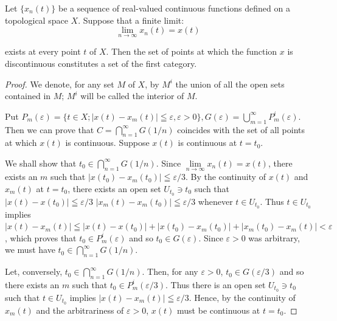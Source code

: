\begin{theoremn} Let $\{x_{n}(t)\}$ be a sequence of real-valued continuous functions defined on a topological space $X$. Suppose that a finite limit: 
\[
\lim\limits _{n \rightarrow \infty} x _{n} (t) = x (t)
\]

exists at every point $t$ of $X$. Then the set of points at which the function $x$ is discontinuous constitutes a set of the first category. 
\end{theoremn}

\begin{proof}
 We denote, for any set $M$ of $X$, by $M^{i}$ the union of all the open sets contained in $M$; $M^{i}$ will be called the interior of $M$. 

 Put $P_{m} (\varepsilon) = \{t \in X; | x (t)- x _{m} (t) | \leqq \varepsilon , \varepsilon > 0 \}, G (\varepsilon) = \bigcup\limits_{m=1} ^{\infty} P _{m} ^{i} (\varepsilon). $ Then we can prove that $C = \bigcap\limits_{n=1}^{\infty} G(1/n)$ coincides with the set of all points at which $x(t)$ is continuous. Suppose $x(t)$ is continuous at $t = t_0$. 

We shall show that $t_0 \in \bigcap\limits_{n=1}^{\infty} G(1/n)$. Since $\lim\limits_{n \to \infty} x_n(t) = x(t)$, there exists an $m$ such that $|x(t_0)- x_m(t_0)| \leqq \varepsilon/3$. By the continuity of $x(t)$ and $x_m(t)$ at $t = t_0$, there exists an open set $U_{t_0} \ni t_0$ such that $|x(t)- x(t_0)| \leqq \varepsilon/3$ $|x_m(t)- x_m(t_0)| \leqq \varepsilon/3$ whenever $t \in U_{t_0}$. Thus $t \in U_{t_0}$ implies $|x(t)- x_m(t)| \leqq |x(t)- x(t_0)| + |x(t_0)- x_m(t_0)| + |x_m(t_0)- x_m(t)| < \varepsilon$, which proves that $t_0 \in P_m^i(\varepsilon)$ and so $t_0 \in G(\varepsilon)$. Since $\varepsilon > 0$ was arbitrary, we must have $t_0 \in \bigcap\limits_{n=1}^{\infty} G(1/n)$. 

Let, conversely, $t_0 \in \bigcap\limits_{n=1}^{\infty} G(1/n)$. Then, for any $\varepsilon > 0$, $t_0 \in G(\varepsilon/3)$ and so there exists an $m$ such that $t_0 \in P_m^i(\varepsilon/3)$. Thus there is an open set $U_{t_0} \ni t_0$ such that $t \in U_{t_0}$ implies $|x(t)- x_m(t)| \leqq \varepsilon/3$. Hence, by the continuity of $x_m(t)$ and the arbitrariness of $\varepsilon > 0$, $x(t)$ must be continuous at $t = t_0$. 


\end{proof}
